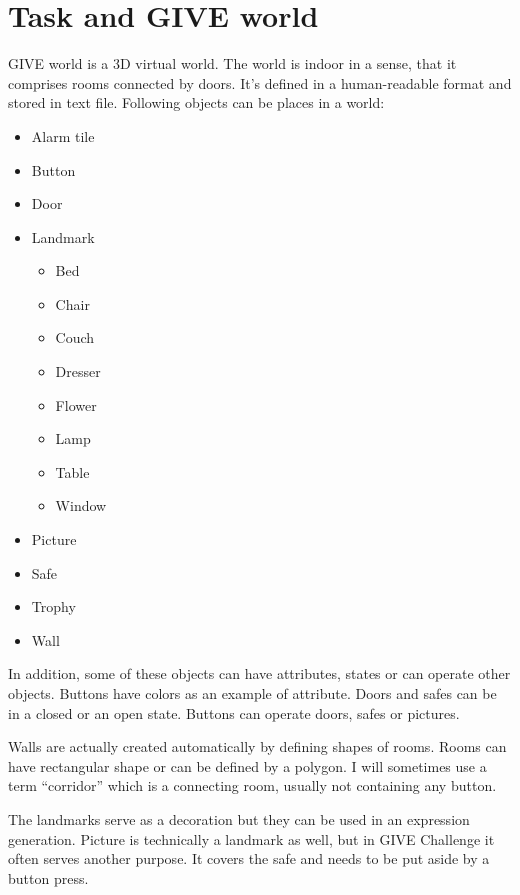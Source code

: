 \section{Task and GIVE world}
\label{sec:task-give-world}
GIVE world is a 3D virtual world. The world is indoor in a sense, that it comprises rooms  connected by doors. It's defined in a human-readable format and stored in text file. Following objects can be places in a world:

\begin{itemize}
\item
Alarm tile
\item
Button
\item
Door
\item 
Landmark
	\begin{itemize}
	\item
	Bed	
	\item
	Chair	
	\item
	Couch	
	\item
	Dresser
	\item
	Flower	
	\item
	Lamp
	\item
	Table
	\item
	Window
	\end{itemize}
\item
Picture
\item
Safe
\item
Trophy
\item
Wall
\end{itemize}
In addition, some of these objects can have attributes, states or can operate other objects. Buttons have colors as an example of attribute. Doors and safes can be in a closed or an open state. Buttons can operate doors, safes or pictures.

Walls are actually created automatically by defining shapes of rooms. Rooms can have rectangular shape or can be defined by a polygon. I will sometimes use a term ``corridor'' which is a connecting room, usually not containing any button.

The landmarks serve as a decoration but they can be used in an expression generation. Picture is technically a landmark as well, but in GIVE Challenge it often serves another purpose. It covers the safe and needs to be put aside by a button press.


